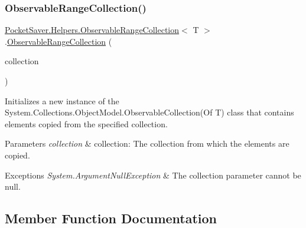 \subsubsection{\texorpdfstring{Observable\+Range\+Collection()}{ObservableRangeCollection()}\hspace{0.1cm}{\footnotesize\ttfamily [2/2]}}
{\footnotesize\ttfamily \hyperlink{class_pocket_saver_1_1_helpers_1_1_observable_range_collection}{Pocket\+Saver.\+Helpers.\+Observable\+Range\+Collection}$<$ T $>$.\hyperlink{class_pocket_saver_1_1_helpers_1_1_observable_range_collection}{Observable\+Range\+Collection} (\begin{DoxyParamCaption}\item[{I\+Enumerable$<$ T $>$}]{collection }\end{DoxyParamCaption})\hspace{0.3cm}{\ttfamily [inline]}}



Initializes a new instance of the System.\+Collections.\+Object\+Model.\+Observable\+Collection(\+Of T) class that contains elements copied from the specified collection. 


\begin{DoxyParams}{Parameters}
{\em collection} & collection\+: The collection from which the elements are copied.\\
\hline
\end{DoxyParams}

\begin{DoxyExceptions}{Exceptions}
{\em System.\+Argument\+Null\+Exception} & The collection parameter cannot be null.\\
\hline
\end{DoxyExceptions}


\subsection{Member Function Documentation}
\mbox{\label{class_pocket_saver_1_1_helpers_1_1_observable_range_collection_ae9693a07699c4573faa9bca6bc291de2}} 
